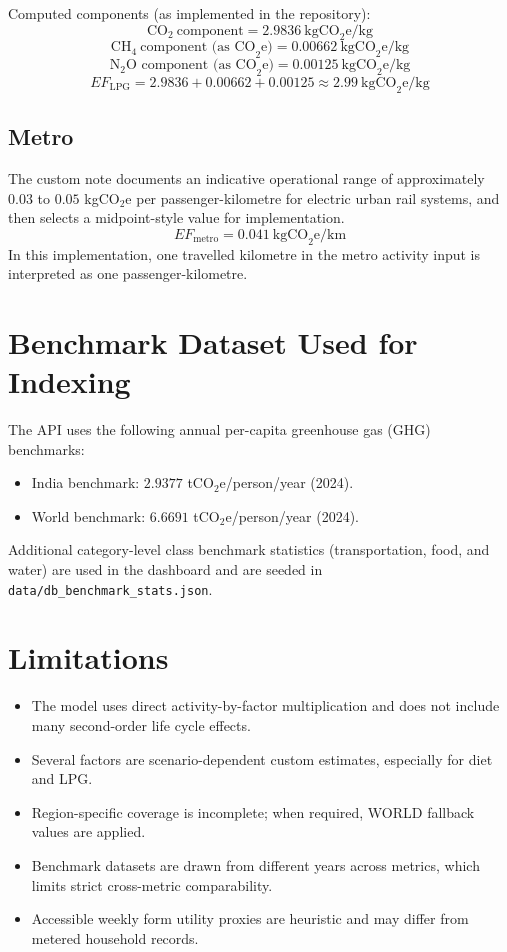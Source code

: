 \documentclass[11pt,a4paper]{article}
\begin{document}
Computed components (as implemented in the repository):
$$
\text{CO}_2\ \text{component} = 2.9836\ \text{kgCO}_2\text{e/kg}
$$
$$
\text{CH}_4\ \text{component (as CO}_2\text{e)} = 0.00662\ \text{kgCO}_2\text{e/kg}
$$
$$
\text{N}_2\text{O component (as CO}_2\text{e)} = 0.00125\ \text{kgCO}_2\text{e/kg}
$$
$$
EF_{\text{LPG}} = 2.9836 + 0.00662 + 0.00125 \approx 2.99\ \text{kgCO}_2\text{e/kg}
$$

\subsection{Metro}
The custom note documents an indicative operational range of approximately \(0.03\) to \(0.05\) kgCO\(_2\)e per passenger-kilometre for electric urban rail systems, and then selects a midpoint-style value for implementation.
$$
EF_{\text{metro}} = 0.041\ \text{kgCO}_2\text{e/km}
$$
In this implementation, one travelled kilometre in the metro activity input is interpreted as one passenger-kilometre.

\section{Benchmark Dataset Used for Indexing}
The API uses the following annual per-capita greenhouse gas (GHG) benchmarks:
\begin{itemize}
  \item India benchmark: \(2.9377\) tCO\(_2\)e/person/year (2024).
  \item World benchmark: \(6.6691\) tCO\(_2\)e/person/year (2024).
\end{itemize}

Additional category-level class benchmark statistics (transportation, food, and water) are used in the dashboard and are seeded in \texttt{data/db\_benchmark\_stats.json}.

\section{Limitations}
\begin{itemize}
  \item The model uses direct activity-by-factor multiplication and does not include many second-order life cycle effects.
  \item Several factors are scenario-dependent custom estimates, especially for diet and LPG.
  \item Region-specific coverage is incomplete; when required, WORLD fallback values are applied.
  \item Benchmark datasets are drawn from different years across metrics, which limits strict cross-metric comparability.
  \item Accessible weekly form utility proxies are heuristic and may differ from metered household records.
\end{itemize}
\end{document}
